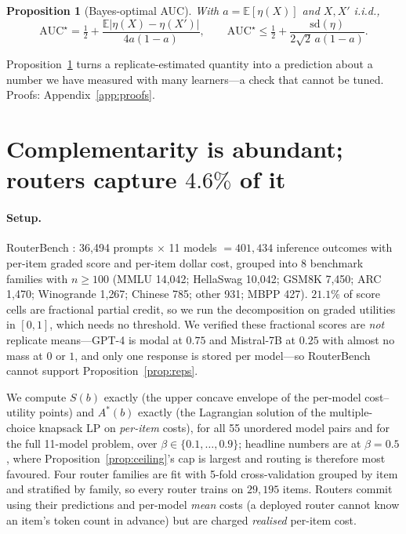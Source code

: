 \documentclass[10pt]{article}
\newtheorem{proposition}{Proposition}
\newcommand{\Sb}{S(b)}
\newcommand{\Astar}{A^{*}(b)}
\newcommand{\E}{\mathbb{E}}
\begin{document}
\begin{proposition}[Bayes-optimal AUC]\label{prop:auc}
With $a=\E[\eta(X)]$ and $X,X'$ i.i.d.,
\[
\mathrm{AUC}^\star=\tfrac12+\frac{\E|\eta(X)-\eta(X')|}{4a(1-a)},
\qquad
\mathrm{AUC}^\star\le\tfrac12+\frac{\mathrm{sd}(\eta)}{2\sqrt2\,a(1-a)}.
\]
\end{proposition}

Proposition~\ref{prop:auc} turns a replicate-estimated quantity into a
prediction about a number we have measured with many learners---a check that
cannot be tuned. Proofs: Appendix~\ref{app:proofs}.

\section{Complementarity is abundant; routers capture $4.6\%$ of it}\label{sec:rb}

\paragraph{Setup.} RouterBench \citep{hu2024routerbench}: 36{,}494 prompts
$\times$ 11 models $=401{,}434$ inference outcomes with per-item graded score and
per-item dollar cost, grouped into 8 benchmark families with $n\ge100$ (MMLU
14{,}042; HellaSwag 10{,}042; GSM8K 7{,}450; ARC 1{,}470; Winogrande 1{,}267;
Chinese 785; other 931; MBPP 427). $21.1\%$ of score cells are fractional
partial credit, so we run the decomposition on graded utilities in $[0,1]$,
which needs no threshold. We verified these fractional scores are \emph{not}
replicate means---GPT-4 is modal at $0.75$ and Mistral-7B at $0.25$ with almost
no mass at $0$ or $1$, and only one response is stored per model---so
RouterBench cannot support Proposition~\ref{prop:reps}.

We compute $\Sb$ exactly (the upper concave envelope of the per-model
cost--utility points) and $\Astar$ exactly (the Lagrangian solution of the
multiple-choice knapsack LP on \emph{per-item} costs), for all 55 unordered
model pairs and for the full 11-model problem, over
$\beta\in\{0.1,\dots,0.9\}$;
headline numbers are at $\beta=0.5$, where Proposition~\ref{prop:ceiling}'s cap
is largest and routing is therefore most favoured. Four router families are fit
with 5-fold cross-validation grouped by item and stratified by family, so every
router trains on $29{,}195$ items. Routers commit using their predictions and
per-model \emph{mean} costs (a deployed router cannot know an item's token count
in advance) but are charged \emph{realised} per-item cost.
\end{document}
